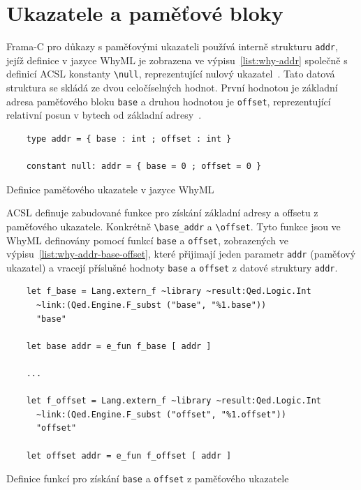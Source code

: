 \section{Ukazatele a paměťové bloky}
\label{sec:ukazatele-a-pametove-bloky}

Frama\mbox{-}C pro důkazy s paměťovými ukazateli používá interně strukturu \texttt{addr},
jejíž definice v jazyce WhyML je zobrazena ve výpisu~\ref{list:why-addr}
společně s definicí ACSL konstanty \texttt{\textbackslash null},
reprezentující nulový ukazatel~\cite{FCGitWhy}.
Tato datová struktura se skládá ze dvou celočíselných hodnot.
První hodnotou je základní adresa paměťového bloku \texttt{base}
a druhou hodnotou je \texttt{offset}, reprezentující relativní posun v bytech od základní adresy~\cite{BlanchardWP2024}.


\begin{listing}[H]
    \begin{verbatim}
    type addr = { base : int ; offset : int }

    constant null: addr = { base = 0 ; offset = 0 }
    \end{verbatim}
    \caption{Definice paměťového ukazatele v jazyce WhyML}
    \label{list:why-addr}
\end{listing}

ACSL definuje zabudované funkce pro získání základní adresy a offsetu z paměťového ukazatele.
Konkrétně \texttt{\textbackslash base\_addr} a \texttt{\textbackslash offset}.
Tyto funkce jsou ve WhyML definovány pomocí funkcí \texttt{base} a \texttt{offset},
zobrazených ve výpisu~\ref{list:why-addr-base-offset},
které přijimají jeden parametr \texttt{addr} (paměťový ukazatel)
a vracejí příslušné hodnoty \texttt{base} a \texttt{offset} z datové struktury \texttt{addr}.

\begin{listing}[H]
    \begin{verbatim}
    let f_base = Lang.extern_f ~library ~result:Qed.Logic.Int
      ~link:(Qed.Engine.F_subst ("base", "%1.base"))
      "base"

    let base addr = e_fun f_base [ addr ]

    ...

    let f_offset = Lang.extern_f ~library ~result:Qed.Logic.Int
      ~link:(Qed.Engine.F_subst ("offset", "%1.offset"))
      "offset"

    let offset addr = e_fun f_offset [ addr ]
    \end{verbatim}
    \caption{Definice funkcí pro získání \texttt{base} a \texttt{offset} z paměťového ukazatele}
    \label{list:why-addr-base-offset}
\end{listing}

